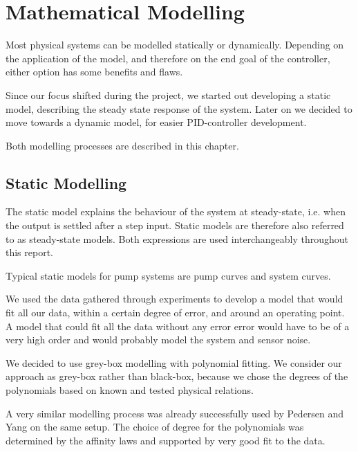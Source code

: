 \chapter{Mathematical Modelling}\label{ch:mathmodel} 
Most physical systems can be modelled statically or dynamically.
Depending on the application of the model,
and therefore on the end goal of the controller,
either option has some benefits and flaws.

Since our focus shifted during the project, we started out developing a static model,
describing the steady state response of the system.
Later on we decided to move towards a dynamic model, for easier PID-controller development.

Both modelling processes are described in this chapter.


\section{Static Modelling}\label{sec:statmod}
The static model explains the behaviour of the system at steady-state,
i.e. when the output is settled after a step input.
Static models are therefore also referred to as steady-state models.
Both expressions are used interchangeably throughout this report.

Typical static models for pump systems are pump curves and system curves.

\newpage
We used the data gathered through experiments to develop a model that would fit all our data,
within a certain degree of error,
and around an operating point.
A model that could fit all the data without any error error would have to be of a very high order
and would probably model the system and sensor noise.

We decided to use grey-box modelling with polynomial fitting.
We consider our approach as grey-box rather than black-box,
because we chose the degrees of the polynomials based on known and tested physical relations.

A very similar modelling process was already successfully used by Pedersen and Yang 
\cite{YangMultiPump2008} on the same setup.
The choice of degree for the polynomials was determined by the affinity laws \cite{Volk2014}
and supported by very good fit to the data.

